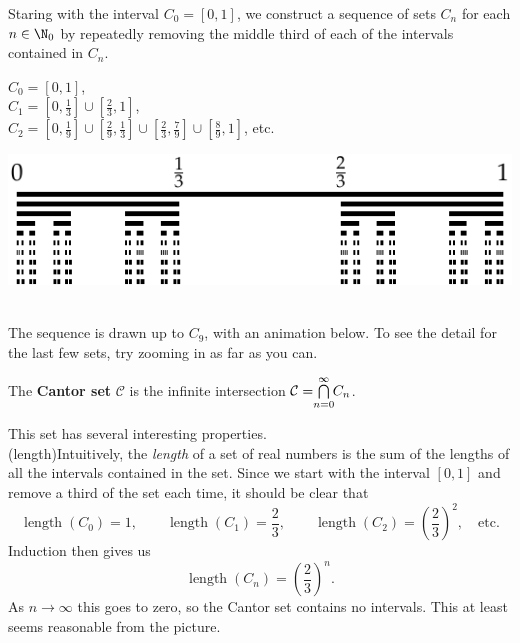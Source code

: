 \noindent Staring with the interval $C_0=[0,1]$, we construct a sequence of sets $C_n$ for each $n\in\N_0$ by repeatedly removing the middle third of each of the intervals contained in $C_n$.

\begin{minipage}{0.40\textwidth}
$C_0=[0,1]$,\\[4pt]
$C_1=[0,\frac 13]\cup [\frac 23,1]$,\\[4pt]
$C_2=[0,\frac 19]\cup [\frac 29,\frac 13]\cup [\frac 23,\frac 79]\cup [\frac 89,1]$, etc.
\end{minipage}
\begin{minipage}{0.55\textwidth}
\includegraphics[width=\textwidth]{setsii-02-cantor}
\end{minipage}\\

\noindent The sequence is drawn up to $C_{9}$, with an animation below. To see the detail for the last few sets, try zooming in as far as you can.\vspace{-5pt}
\begin{center}
\end{center}\vspace{-8pt}

\begin{defn}
The \textbf{Cantor set} $\mathcal C$ is the infinite intersection $\mathcal C=\negthickspace\bigcap\limits_{n=0}^\infty\negthickspace C_n$.
\end{defn}

\noindent This set has several interesting properties.\\

 (length)\quad Intuitively, the \emph{length} of a set of real numbers is the sum of the lengths of all the intervals contained in the set. Since we start with the interval $[0,1]$ and remove a third of the set each time, it should be clear that
\[\operatorname{length}(C_0)=1,\qquad \operatorname{length}(C_1)=\frac 23,\qquad\operatorname{length}(C_2)=\left(\frac 23\right)^2,\quad\text{etc.}\]
Induction then gives us
\[\operatorname{length}(C_n)=\left(\frac 23\right)^n.\]
As $n\to\infty$ this goes to zero, so the Cantor set contains no intervals. This at least seems reasonable from the picture.\\

